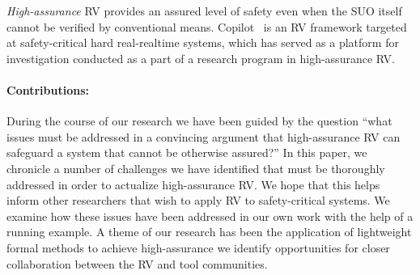 \emph{High-assurance} RV provides an assured level of safety even when
the SUO itself cannot be verified  by conventional
means. Copilot~\cite{copilot, pike-isse-13} is an RV framework
targeted at safety-critical hard real-realtime systems, which has
served as a platform for investigation  conducted as a part of a
research   program in  high-assurance RV.  


\paragraph{Contributions:} During the course of our research we have
been guided by the question ``what
 issues must be  addressed in a convincing argument  that  high-assurance RV can safeguard a
system that cannot be otherwise assured?''  In this paper, we
chronicle a number of  challenges we have identified that must be
thoroughly addressed in order to actualize high-assurance RV.  We hope
that this helps inform other researchers that wish to apply RV to
safety-critical systems. We examine  how  these issues have been
addressed in our own work   with the help of a running example. A
theme of our research has been the 
application of lightweight formal methods to achieve
high-assurance  we identify opportunities for closer collaboration
between the RV and tool communities.   



